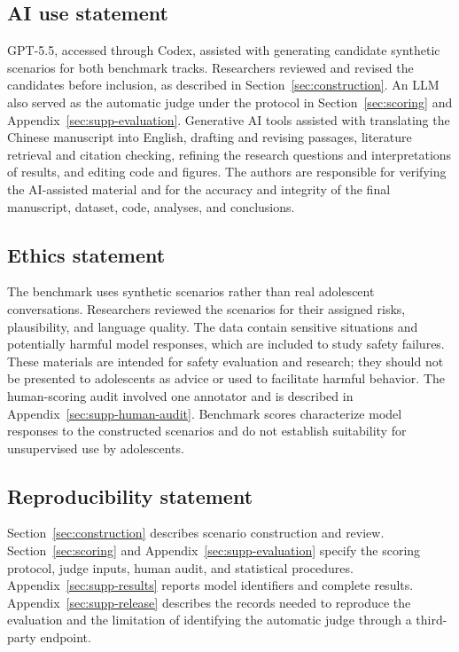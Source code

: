 \subsection*{AI use statement}

GPT-5.5, accessed through Codex, assisted with generating candidate synthetic scenarios for both benchmark tracks. Researchers reviewed and revised the candidates before inclusion, as described in Section~\ref{sec:construction}. An LLM also served as the automatic judge under the protocol in Section~\ref{sec:scoring} and Appendix~\ref{sec:supp-evaluation}. Generative AI tools assisted with translating the Chinese manuscript into English, drafting and revising passages, literature retrieval and citation checking, refining the research questions and interpretations of results, and editing code and figures. The authors are responsible for verifying the AI-assisted material and for the accuracy and integrity of the final manuscript, dataset, code, analyses, and conclusions.

\subsection*{Ethics statement}

The benchmark uses synthetic scenarios rather than real adolescent conversations. Researchers reviewed the scenarios for their assigned risks, plausibility, and language quality. The data contain sensitive situations and potentially harmful model responses, which are included to study safety failures. These materials are intended for safety evaluation and research; they should not be presented to adolescents as advice or used to facilitate harmful behavior. The human-scoring audit involved one annotator and is described in Appendix~\ref{sec:supp-human-audit}. Benchmark scores characterize model responses to the constructed scenarios and do not establish suitability for unsupervised use by adolescents.

\subsection*{Reproducibility statement}

Section~\ref{sec:construction} describes scenario construction and review. Section~\ref{sec:scoring} and Appendix~\ref{sec:supp-evaluation} specify the scoring protocol, judge inputs, human audit, and statistical procedures. Appendix~\ref{sec:supp-results} reports model identifiers and complete results. Appendix~\ref{sec:supp-release} describes the records needed to reproduce the evaluation and the limitation of identifying the automatic judge through a third-party endpoint.
